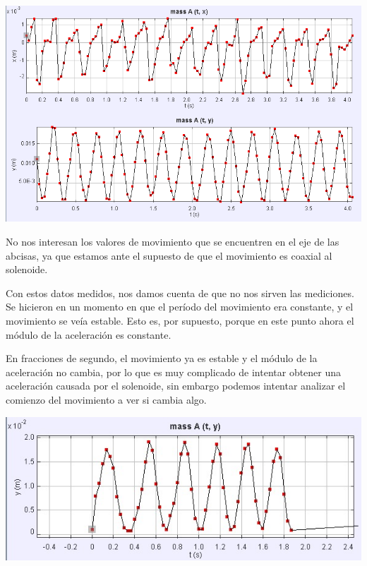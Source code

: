 \documentclass[a4paper,12pt]{article}
\newenvironment{Figure}
    {\par\medskip\noindent\minipage{\linewidth}}
    {\endminipage\par\medskip}
\begin{document}
        \begin{Figure}
            \centering

            \includegraphics[width=0.6\linewidth]{mediciones_movimientoLineal.png}
            \label{fig: mediciones_movimientoLineal}
        \end{Figure}

        No nos interesan los valores de movimiento que se encuentren en el eje de las abcisas, ya que estamos ante el supuesto de que el movimiento es coaxial al solenoide.

        Con estos datos medidos, nos damos cuenta de que no nos sirven las mediciones. Se hicieron en un momento en que el período del movimiento era constante, y el movimiento se veía estable. Esto es, por supuesto, porque en este punto ahora el módulo de la aceleración es constante.

        En fracciones de segundo, el movimiento ya es estable y el módulo de la aceleración no cambia, por lo que es muy complicado de intentar obtener una aceleración causada por el solenoide, sin embargo podemos intentar analizar el comienzo del movimiento a ver si cambia algo.

        \begin{Figure}
            \centering

            \includegraphics[width=0.6\linewidth]{mediciones_movimientoLinealAcelerado.jpg}
            \label{fig: mediciones_movimientoLinealAcelerado}
        \end{Figure}
\end{document}
